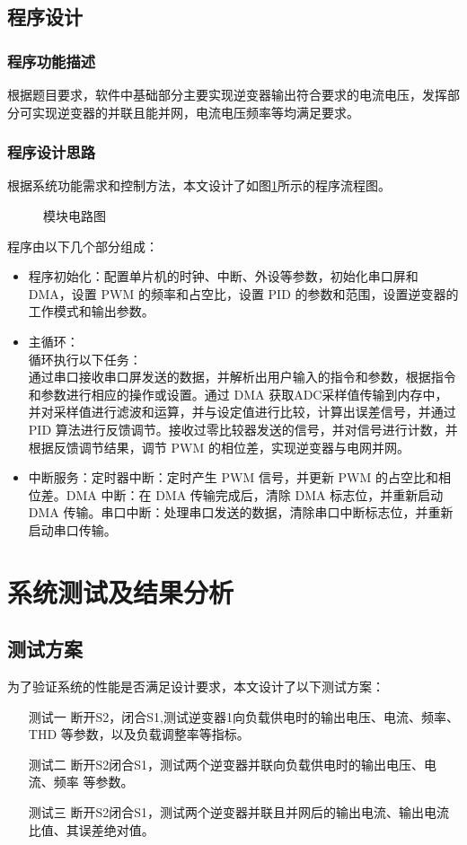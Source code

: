 \documentclass[a4paper,12pt]{article}
\begin{document}
\subsection{程序设计}

\subsubsection{程序功能描述}
根据题目要求，软件中基础部分主要实现逆变器输出符合要求的电流电压，发挥部分可实现逆变器的并联且能并网，电流电压频率等均满足要求。

\subsubsection{程序设计思路}
根据系统功能需求和控制方法，本文设计了如图\ref{fig8}所示的程序流程图。
\begin{figure}
\centering
\caption{模块电路图}
\label{fig8}
\end{figure}

程序由以下几个部分组成：
\begin{itemize}
    \item 程序初始化：配置单片机的时钟、中断、外设等参数，初始化串口屏和 DMA，设置 PWM 的频率和占空比，设置 PID 的参数和范围，设置逆变器的工作模式和输出参数。
    \item 主循环：\\ 循环执行以下任务：\\ 通过串口接收串口屏发送的数据，并解析出用户输入的指令和参数，根据指令和参数进行相应的操作或设置。通过 DMA 获取ADC采样值传输到内存中，并对采样值进行滤波和运算，并与设定值进行比较，计算出误差信号，并通过 PID 算法进行反馈调节。接收过零比较器发送的信号，并对信号进行计数，并根据反馈调节结果，调节 PWM 的相位差，实现逆变器与电网并网。
    \item 中断服务：定时器中断：定时产生 PWM 信号，并更新 PWM 的占空比和相位差。DMA 中断：在 DMA 传输完成后，清除 DMA 标志位，并重新启动 DMA 传输。串口中断：处理串口发送的数据，清除串口中断标志位，并重新启动串口传输。
\end{itemize}

\newpage

\section{系统测试及结果分析}

\subsection{测试方案}
为了验证系统的性能是否满足设计要求，本文设计了以下测试方案：
\begin{itemize}
    \item[测试一] 断开S2，闭合S1,测试逆变器1向负载供电时的输出电压、电流、频率、THD 等参数，以及负载调整率等指标。
    \item[测试二] 断开S2闭合S1，测试两个逆变器并联向负载供电时的输出电压、电流、频率 等参数。
    \item[测试三] 断开S2闭合S1，测试两个逆变器并联且并网后的输出电流、输出电流比值、其误差绝对值。
\end{itemize}
\end{document}
